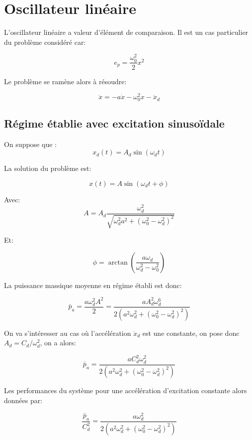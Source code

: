 \documentclass[a4paper,11pt,twoside]{article}
\begin{document}
\section{Oscillateur linéaire}

L'oscillateur linéaire a valeur d'élément de comparaison. Il est un cas particulier du problème considéré car:

\begin{equation}
e_p = \frac{\omega_0^2}{2} x^2
\end{equation}

Le problème se ramène alors à résoudre:

\begin{equation}
\ddot{x} = -a \dot{x} - \omega_0^2 x - \ddot{x}_d
\end{equation}

\subsection{Régime établie avec excitation sinusoïdale}

On suppose que :
$$
x_d(t) = A_d \sin(\omega_d t)
$$

La solution du problème est:

\begin{equation}
x(t) = A \sin(\omega_d t + \phi) 
\end{equation}

Avec:
\begin{equation}
A = A_d\dfrac{\omega_d^2 }{\sqrt{\omega_d^2 a^2 + \left( \omega_0^2 - \omega_d^2\right)^2 } } 
\end{equation}

Et:

\begin{equation}
\phi = \arctan \left(\dfrac{a\omega_d}{\omega_d^2 - \omega_0^2} \right )
\end{equation}

La puissance massique moyenne en régime établi est donc:

\begin{equation}
\bar p_a = \frac{a\omega_d^2 A^2}{2} =   \dfrac{ a A_d^2 \omega_d^6}{2\left(a^2\omega_d^2 + \left( \omega_0^2 - \omega_d^2\right)^2 \right) } 
\end{equation}

On va s'intéresser au cas où l'accélération $\ddot{x}_d$ est une constante, on pose donc $A_d = C_d / \omega_d^2$, on a alors:

\begin{equation}
\bar p_a = \dfrac{ a C_d^2 \omega_d^2}{2\left(a^2\omega_d^2 + \left( \omega_0^2 - \omega_d^2\right)^2 \right) } 
\end{equation}

Les performances du système pour une accélération d'excitation constante alors données par:

\begin{equation}
\dfrac{\bar p_a}{C_d^2} = \dfrac{ a \omega_d^2}{2\left(a^2\omega_d^2 + \left( \omega_0^2 - \omega_d^2\right)^2 \right) } 
\end{equation}
\end{document}
